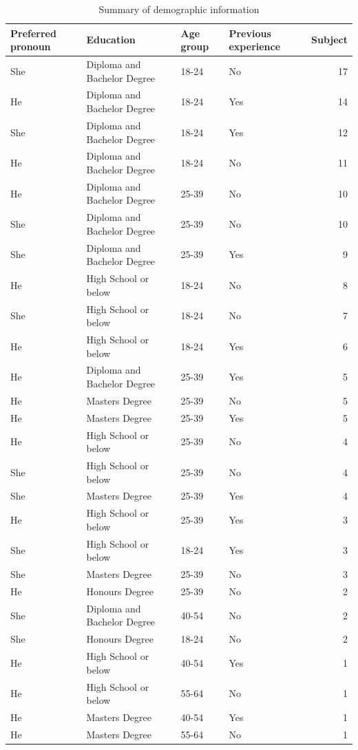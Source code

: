 \documentclass[]{interact}
\theoremstyle{plain}%
\theoremstyle{definition}
\theoremstyle{remark}
\begin{document}
\begin{table}

\caption{\label{tab:demographic-table}Summary of demographic information}
\centering
\begin{tabular}[t]{llllr}
\toprule
Preferred pronoun & Education & Age group & Previous experience & Subject\\
\midrule
She & Diploma and Bachelor Degree & 18-24 & No & 17\\
He & Diploma and Bachelor Degree & 18-24 & Yes & 14\\
She & Diploma and Bachelor Degree & 18-24 & Yes & 12\\
He & Diploma and Bachelor Degree & 18-24 & No & 11\\
He & Diploma and Bachelor Degree & 25-39 & No & 10\\
She & Diploma and Bachelor Degree & 25-39 & No & 10\\
She & Diploma and Bachelor Degree & 25-39 & Yes & 9\\
He & High School or below & 18-24 & No & 8\\
She & High School or below & 18-24 & No & 7\\
He & High School or below & 18-24 & Yes & 6\\
He & Diploma and Bachelor Degree & 25-39 & Yes & 5\\
He & Masters Degree & 25-39 & No & 5\\
He & Masters Degree & 25-39 & Yes & 5\\
He & High School or below & 25-39 & No & 4\\
She & High School or below & 25-39 & No & 4\\
She & Masters Degree & 25-39 & Yes & 4\\
He & High School or below & 25-39 & Yes & 3\\
She & High School or below & 18-24 & Yes & 3\\
She & Masters Degree & 25-39 & No & 3\\
He & Honours Degree & 25-39 & No & 2\\
She & Diploma and Bachelor Degree & 40-54 & No & 2\\
She & Honours Degree & 18-24 & No & 2\\
He & High School or below & 40-54 & Yes & 1\\
He & High School or below & 55-64 & No & 1\\
He & Masters Degree & 40-54 & Yes & 1\\
He & Masters Degree & 55-64 & No & 1\\

\end{tabular}
\end{table}
\end{document}
